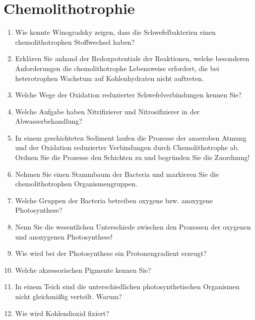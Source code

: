 
\section{Chemolithotrophie}
\begin{enumerate}
	\item Wie konnte Winogradsky zeigen, dass die Schwefelbakterien einen chemolithotrophen Stoffwechsel haben?
	\item Erklären Sie anhand der Redoxpotentiale der Reaktionen, welche besonderen Anforderungen die chemolithotrophe Lebensweise erfordert, die bei heterotrophen Wachstum auf Kohlenhydraten nicht auftreten.
	\item Welche Wege der Oxidation reduzierter Schwefelverbindungen kennen Sie?
	\item Welche Aufgabe haben Nitrifizierer und Nitrosifizierer in der Abwasserbehandlung?
	\item In einem geschichteten Sediment laufen die Prozesse der anaeroben Atmung und der Oxidation reduzierter Verbindungen durch Chemolithotrophe ab. Ordnen Sie die Prozesse den Schichten zu und begründen Sie die Zuordnung!
	\item Nehmen Sie einen Stammbaum der Bacteria und markieren Sie die chemolithotrophen Organismengruppen. 
	\item Welche Gruppen der Bacteria betreiben oxygene bzw. anoxygene Photosynthese?
	\item Nenn Sie die wesentlichen Unterschiede zwischen den Prozessen der oxygenen und anoxygenen Photosynthese!
	\item Wie wird bei der Photosynthese ein Protonengradient erzeugt?
	\item Welche akzessorischen Pigmente kennen Sie? 
	\item In einem Teich sind die unterschiedlichen photosynthetischen Organismen nicht gleichmäßig verteilt. Warum?
	\item Wie wird Kohlendioxid fixiert?
\end{enumerate}
